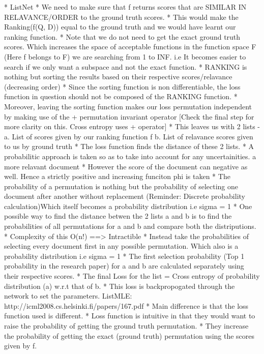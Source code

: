 \documentclass[12pt, twoside, ngerman]{report}
\begin{document}
    * ListNet
    * We need to make sure that f returns scores that are SIMILAR IN RELAVANCE/ORDER to the ground truth scores.
    * This would make the Ranking(f(Q, D)) equal to the ground truth and we would have learnt our ranking function.
    * Note that we do not need to get the exact ground truth scores. Which increases the space of acceptable functions in the
      function space F (Here f belongs to F) we are searching from 1 to INF. i.e It becomes easier to search if we only want a subspace and not the exact function.
    * RANKING is nothing but sorting the results based on their respective scores/relavance (decreasing order)
    * Since the sorting function is non differentiable, the loss function in question should not be composed of the RANKING function.
    * Moreover, leaving the sorting function makes our loss permutation independent by making use of the + permutation invariant operator
      [Check the final step for more clarity on this. Cross entropy uses + operator]
    * This leaves us with 2 lists -
        a. List of scores given by our ranking function f
        b. List of relavance scores given to us by ground truth
    * The loss function finds the distance of these 2 lists.
    * A probabilitic approach is taken so as to take into account for any uncertainities.
      a more relavant document
    * However the score of the document can negative as well. Hence a strictly positive and increasing funciton phi is taken
    * The probability of a permutation is nothing but the probability of selecting one document after another without replacement
      (Reminder: Discrete probability calculation){Which itself becomes a probability distribution i.e sigma = 1}
    * One possible way to find the distance betwen the 2 lists a and b is to find the probabilities of all permutations for a and b
      and compare both the distriputions. 
    * Complexity of this O(n!) ==> Intractible
    * Instead take the probabilities of selecting every document first in any possible permutation. {Which also is a probability 
      distribution i.e sigma = 1}
    * The first selection probability (Top 1 probability in the research paper) for a and b are calculated separately using their
      respective scores.
    * The final Loss for the list = Cross entropy of probability distribution (a) w.r.t that of b.
    * This loss is backpropogated through the network to set the parameters.
%
    ListMLE: http://icml2008.cs.helsinki.fi/papers/167.pdf
    * Main difference is that the loss function used is different.
    * Loss function is intuitive in that they would want to raise the probability of getting the ground truth permutation.
    * They increase the probability of getting the exact (ground truth) permutation using the scores given by f.
\end{document}

